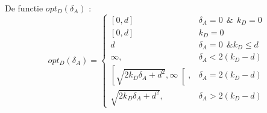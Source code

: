 \documentclass[master=cws, masteroption=vs,english]{kulemt}
\begin{document}
\begin{abstract*}

De functie $opt_{D}(\delta_{A})$ :
 \begin{displaymath}
  opt_{D}(\delta_{A}) = \left\{
     \begin{array}{lr}
     \left[0,d\right] & \delta_{A} =0 ~~\& ~~k_{D}=0 \\
     \left[0,d\right] & k_{D}=0\\
     d & \delta_{A} =0 ~~ \& k_{D} \leq d\\
          \infty , & \delta_{A} < 2(k_{D} - d)\\
      \left[ \sqrt{2k_{D}\delta_{A} + d^{2}},\infty\right[ , & \delta_{A} = 2(k_{D} - d) \\
      \sqrt{2k_{D}\delta_{A} + d^{2}}, & \delta_{A} > 2(k_{D} - d)
     \end{array}
   \right.
\end{displaymath}


\end{abstract*}
\end{document}
